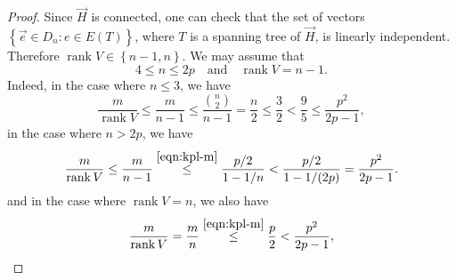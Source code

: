 \documentclass[11pt]{article}
\theoremstyle{definition}
\theoremstyle{remark}
\DeclareMathOperator{\rank}{rank}
\newcommand{\dset}[2]{\left\{{#1}\colon{#2}\right\}}
\newcommand{\sset}[1]{\left\{{#1}\right\}}
\begin{document}
\begin{proof}
    Since $\vec{H}$ is connected, one can check that the set of vectors $\dset{\vec{e} \in D_n}{e \in E(T)}$, where $T$ is a spanning tree of $\vec{H}$, is linearly independent. Therefore $\rank V \in \sset{n - 1, n}$. We may assume that \[
        4 \le n \le 2p \quad\text{and}\quad \rank V = n-1.
    \]
    Indeed, in the case where $n \le 3$, we have
    \[
        \frac{m}{\rank V} \le \frac{m}{n-1} \le \frac{\binom{n}{2}}{n-1} = \frac{n}{2} \le \frac{3}{2} < \frac{9}{5} \le \frac{p^2}{2p-1},
    \]
    in the case where $n > 2p$, we have
    \[
        \frac{m}{\rank V} \le \frac{m}{n-1} \stackrel{\eqref{eqn:kpl-m}}{\le} \frac{p/2}{1-1/n} < \frac{p/2}{1-1/(2p)} = \frac{p^2}{2p-1}.
    \]
    and in the case where $\rank V = n$, we also have
    \[
        \frac{m}{\rank V} = \frac{m}{n} \stackrel{\eqref{eqn:kpl-m}}{\le} \frac{p}{2} < \frac{p^2}{2p-1},
    \]
    

\end{proof}
\end{document}
